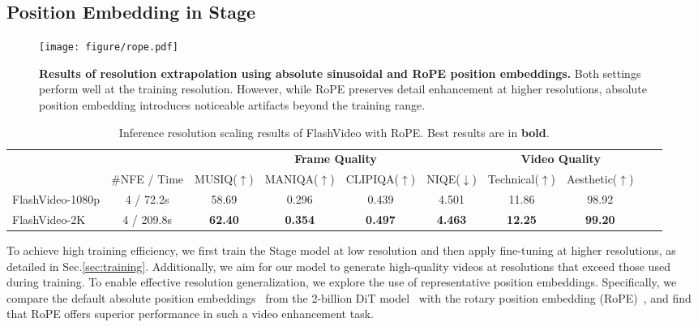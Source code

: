 \subsection{Position Embedding in Stage }
\label{sec:pos_emb}


\begin{figure}[t]
\begin{center}
\texttt{[image: figure/rope.pdf]}
\end{center}
\caption{\textbf{Results of resolution extrapolation using absolute sinusoidal and RoPE position embeddings.} Both settings perform well at the training resolution. However, while RoPE preserves detail enhancement at higher resolutions, absolute position embedding introduces noticeable artifacts beyond the training range.
}
\label{fig:rope}
\end{figure}



\begin{table*}[t]
\centering
\scriptsize
\setlength{\tabcolsep}{5pt}
\renewcommand{\arraystretch}{1.0}
\begin{tabular}{lccccccccc}
\toprule
&  & \multicolumn{4}{c}{\textbf{Frame Quality}} & \multicolumn{2}{c}{\textbf{Video  Quality}}  \\
\cmidrule(lr){3-6}
\cmidrule(lr){7-8}


    & \#NFE / Time &  MUSIQ($\uparrow$) & MANIQA($\uparrow$) & CLIPIQA($\uparrow$) & NIQE($\downarrow$)   &  Technical($\uparrow$)   & Aesthetic($\uparrow$)    \\
\midrule

FlashVideo-1080p & 4 / 72.2s &  58.69 & 0.296 & 0.439 & 4.501 & 11.86 & 98.92   \\
FlashVideo-2K  &  4 / 209.8s   & \textbf{62.40}  & \textbf{0.354} & \textbf{0.497} & \textbf{4.463} & \textbf{12.25} & \textbf{99.20}  \\


\bottomrule
\end{tabular}
\caption{Inference resolution scaling results of FlashVideo with RoPE. Best results  are in \textbf{bold}.}
\label{table:rope_extr}
\end{table*}





To achieve high training efficiency, we first train the Stage  model at low resolution and then apply fine-tuning at higher resolutions, as detailed in Sec.\ref{sec:training}. Additionally, we aim for our model to generate high-quality videos at resolutions that exceed those used during training. To enable effective resolution generalization, we explore the use of representative position embeddings. Specifically, we compare the default absolute position embeddings~\citep{attention} from the 2-billion DiT model~\citep{cogvideox} with the rotary position embedding (RoPE)~\citep{rope}, and find that RoPE offers superior performance in such a video enhancement task.

